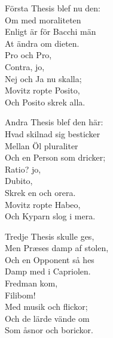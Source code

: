 \vspace{10pt}
Första Thesis blef nu den:\\
Om med moraliteten\\
Enligt är för Bacchi män\\
At ändra om dieten.\\
	Pro och Pro,\\
	Contra, jo,\\
	Nej och Ja nu skalla;\\
Movitz ropte Posito,\\
Och Posito skrek alla.\par
\vspace{10pt}
Andra Thesis blef den här:\\
Hvad skilnad sig besticker\\
Mellan Öl pluraliter\\
Och en Person som dricker;\\
	Ratio? jo,\\
	Dubito,\\
	Skrek en och orera.\\
Movitz ropte Habeo,\\
Och Kyparn slog i mera.\par
\vspace{10pt}
Tredje Thesis skulle ges,\\
Men Præses damp af stolen,\\
Och en Opponent så hes\\
Damp med i Capriolen.\\ 
	Fredman kom,\\
	Filibom!\\
	Med musik och flickor;\\
Och de lärde vände om\\
Som åsnor och borickor.
